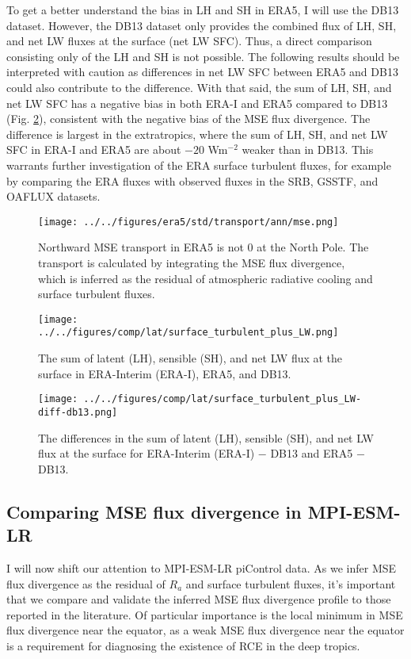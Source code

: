 \documentclass[11pt]{article}
\begin{document}
To get a better understand the bias in LH and SH in ERA5, I will use the DB13 dataset. However, the DB13 dataset only provides the combined flux of LH, SH, and net LW fluxes at the surface (net LW SFC). Thus, a direct comparison consisting only of the LH and SH is not possible. The following results should be interpreted with caution as differences in net LW SFC between ERA5 and DB13 could also contribute to the difference. With that said, the sum of LH, SH, and net LW SFC has a negative bias in both ERA-I and ERA5 compared to DB13 (Fig. \ref{fig:org26b6917}), consistent with the negative bias of the MSE flux divergence. The difference is largest in the extratropics, where the sum of LH, SH, and net LW SFC in ERA-I and ERA5 are about \(-20\) Wm\(^{-2}\) weaker than in DB13. This warrants further investigation of the ERA surface turbulent fluxes, for example by comparing the ERA fluxes with observed fluxes in the SRB, GSSTF, and OAFLUX datasets.

\begin{figure}[htbp]
\centering
\texttt{[image: ../../figures/era5/std/transport/ann/mse.png]}
\caption{\label{fig:org29f0494}Northward MSE transport in ERA5 is not 0 at the North Pole. The transport is calculated by integrating the MSE flux divergence, which is inferred as the residual of atmospheric radiative cooling and surface turbulent fluxes.}
\end{figure}

\begin{figure}[htbp]
\centering
\texttt{[image: ../../figures/comp/lat/surface\_turbulent\_plus\_LW.png]}
\caption{\label{fig:org26b6917}The sum of latent (LH), sensible (SH), and net LW flux at the surface in ERA-Interim (ERA-I), ERA5, and DB13.}
\end{figure}

\begin{figure}[htbp]
\centering
\texttt{[image: ../../figures/comp/lat/surface\_turbulent\_plus\_LW-diff-db13.png]}
\caption{\label{fig:orge633f0b}The differences in the sum of latent (LH), sensible (SH), and net LW flux at the surface for ERA-Interim (ERA-I) \(-\) DB13 and ERA5 \(-\) DB13.}
\end{figure}

\subsection{Comparing MSE flux divergence in MPI-ESM-LR}
\label{sec:orgb04731d}
I will now shift our attention to MPI-ESM-LR piControl data. As we infer MSE flux divergence as the residual of \(R_a\) and surface turbulent fluxes, it's important that we compare and validate the inferred MSE flux divergence profile to those reported in the literature. Of particular importance is the local minimum in MSE flux divergence near the equator, as a weak MSE flux divergence near the equator is a requirement for diagnosing the existence of RCE in the deep tropics.
\end{document}
